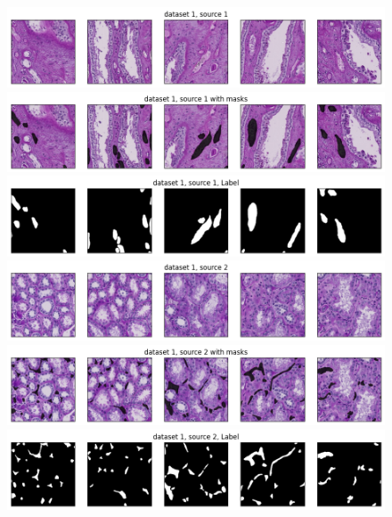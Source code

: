 \begin{figure}[htbp]
	\centering
	\includegraphics[width=\textwidth]{gambar/bab4/ds1s1_0.png} \\
	\includegraphics[width=\textwidth]{gambar/bab4/ds1s1_1.png} \\
	\includegraphics[width=\textwidth]{gambar/bab4/ds1s1_2.png} \\
	\includegraphics[width=\textwidth]{gambar/bab4/ds1s2_0.png} \\
	\includegraphics[width=\textwidth]{gambar/bab4/ds1s2_1.png} \\
	\includegraphics[width=\textwidth]{gambar/bab4/ds1s2_2.png} \\
	\label{fig:ds1_image}
	
\end{figure}


